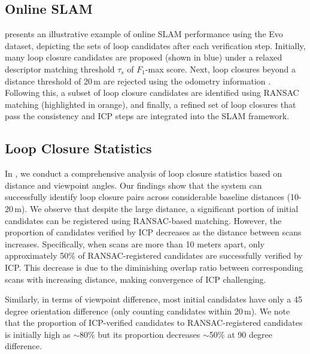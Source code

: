 \subsection{Online SLAM}
 presents an illustrative example of online SLAM performance using the Evo dataset, depicting the sets of loop candidates after each verification step. Initially, many loop closure candidates are proposed (shown in blue) under a relaxed descriptor matching threshold $\tau_{s}$ of  $F_1$-max score. Next, loop closures beyond a distance threshold of 20\,m are rejected using the odometry information . Following this, a subset of loop closure candidates are identified using RANSAC matching (highlighted in orange), and finally, a refined set of loop closures that pass the consistency and ICP steps are integrated into the SLAM framework.

\subsection{Loop Closure Statistics}
In , we conduct a comprehensive analysis of loop closure statistics based on distance and viewpoint angles. Our findings show that the system can successfully identify loop closure pairs across considerable baseline distances (10-20\,m). We observe that despite the large distance, a significant portion of initial candidates can be registered using RANSAC-based matching. However, the proportion of candidates verified by ICP decreases as the distance between scans increases. Specifically, when scans are more than 10 meters apart, only approximately 50\% of RANSAC-registered candidates are successfully verified by ICP. This decrease is due to the diminishing overlap ratio between corresponding scans with increasing distance, making convergence of ICP challenging.

Similarly, in terms of viewpoint difference, most initial candidates have only a 45 degree orientation difference (only counting candidates within 20\,m). We note that the proportion of ICP-verified candidates to RANSAC-registered candidates is initially high as $\sim$80\% but its proportion decreases  $\sim$50\% at 90 degree difference. 

